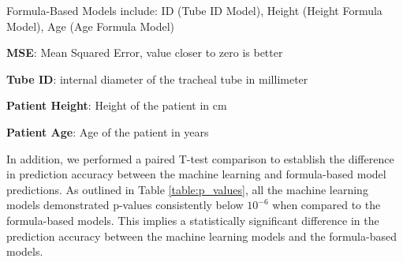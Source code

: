 \documentclass[11pt]{article}
\begin{document}
\begin{table}[h]
\caption{Mean Squared Error for each Formula-Based Model}
\label{table:formula_mse}
\begin{threeparttable}
\renewcommand{\TPTminimum}{\linewidth}
\begin{tablenotes}
\footnotesize
\item Formula-Based Models include: ID (Tube ID Model), Height (Height Formula Model), Age (Age Formula Model)
\item \textbf{MSE}: Mean Squared Error, value closer to zero is better
\item \textbf{Tube ID}: internal diameter of the tracheal tube in millimeter
\item \textbf{Patient Height}: Height of the patient in cm
\item \textbf{Patient Age}: Age of the patient in years
\end{tablenotes}
\end{threeparttable}
\end{table}


In addition, we performed a paired T-test comparison to establish the difference in prediction accuracy between the machine learning and formula-based model predictions. As outlined in Table {}\ref{table:p_values}, all the machine learning models demonstrated p-values consistently below $10^{-6}$ when compared to the formula-based models. This implies a statistically significant difference in the prediction accuracy between the machine learning models and the formula-based models.
\end{document}
